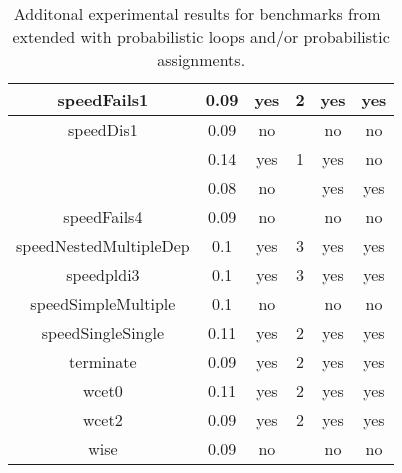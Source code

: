 \begin{center}
\begin{table}[]
\begin{tabular}{c|c|c|c|c|c}
{speedFails1} & {0.09} & {yes} & {2} & {yes} & {yes} \\\hline
{speedDis1} & {0.09} & {no} & {} & {no} & {no} \\\hline
{\multirow{2}{*}{speedFails2}} & {0.14} & {yes} & {1} & {yes} & {no} \\\cline{2-6}
{} & {0.08} & {no} & {} & {yes} & {yes} \\\hline
{speedFails4} & {0.09} & {no} & {} & {no} & {no} \\\hline
{speedNestedMultipleDep} & {0.1} & {yes} & {3} & {yes} & {yes} \\\hline
{speedpldi3} & {0.1} & {yes} & {3} & {yes} & {yes} \\\hline
{speedSimpleMultiple} & {0.1} & {no} & {} & {no} & {no} \\\hline
{speedSingleSingle} & {0.11} & {yes} & {2} & {yes} & {yes} \\\hline
{terminate} & {0.09} & {yes} & {2} & {yes} & {yes} \\\hline
{wcet0} & {0.11} & {yes} & {2} & {yes} & {yes} \\\hline
{wcet2} & {0.09} & {yes} & {2} & {yes} & {yes} \\\hline
{wise} & {0.09} & {no} & {} & {no} & {no} \\\hline
    \end{tabular}
    \caption{Additonal experimental results for benchmarks from~\cite{ADFG10:lexicographic} extended with probabilistic loops and/or probabilistic assignments.}
    \label{tab:exp3}
\end{table}
\end{center}


